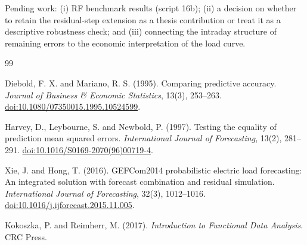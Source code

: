 \documentclass[10pt,a4paper]{article}
\begin{document}
Pending work: (i) RF benchmark results (script 16b); (ii) a decision on whether to retain the residual-step extension as a thesis contribution or treat it as a descriptive robustness check; and (iii) connecting the intraday structure of remaining errors to the economic interpretation of the load curve.

\begin{thebibliography}{99}

Diebold, F. X. and Mariano, R. S. (1995).
Comparing predictive accuracy.
\textit{Journal of Business \& Economic Statistics}, 13(3), 253--263.
\href{https://doi.org/10.1080/07350015.1995.10524599}{doi:10.1080/07350015.1995.10524599}.

Harvey, D., Leybourne, S. and Newbold, P. (1997).
Testing the equality of prediction mean squared errors.
\textit{International Journal of Forecasting}, 13(2), 281--291.
\href{https://doi.org/10.1016/S0169-2070(96)00719-4}{doi:10.1016/S0169-2070(96)00719-4}.

Xie, J. and Hong, T. (2016).
GEFCom2014 probabilistic electric load forecasting: An integrated solution with
forecast combination and residual simulation.
\textit{International Journal of Forecasting}, 32(3), 1012--1016.
\href{https://doi.org/10.1016/j.ijforecast.2015.11.005}{doi:10.1016/j.ijforecast.2015.11.005}.

Kokoszka, P. and Reimherr, M. (2017).
\textit{Introduction to Functional Data Analysis}.
CRC Press.

\end{thebibliography}
\end{document}
